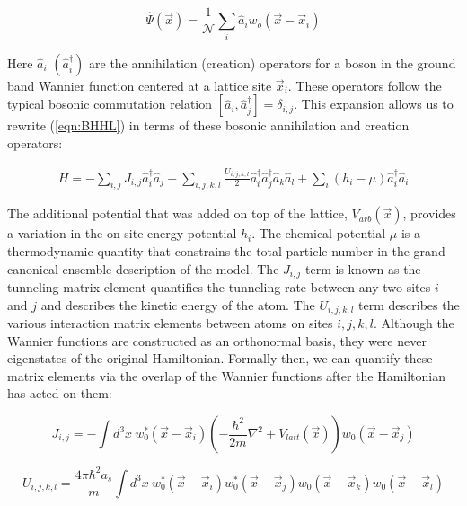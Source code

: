 \begin{equation}
\label{eqn:wfh}
\hat{\Psi}(\vec{x}) = \frac{1}{\mathcal{N}} \sum_i \hat{a}_i w_o(\vec{x}-\vec{x}_i)
\end{equation}

Here $\hat{a}_i$ $(\hat{a}^\dagger_i)$ are the annihilation (creation) operators for a boson in the ground band Wannier function centered at a lattice site $\vec{x}_i$. These operators follow the typical bosonic commutation relation $ [\hat{a}_i, \hat{a}_j^\dagger]=\delta_{i,j}$. This expansion allows us to rewrite (\ref{eqn:BHHL}) in terms of these bosonic annihilation and creation operators:

\begin{equation}
\begin{aligned}
H = - \sum_{i,j} J_{i,j} \hat{a}_i^\dagger \hat{a}_j + \sum_{i,j,k,l} \frac{U_{i,j,k,l}}{2} \hat{a}_i^\dagger \hat{a}_j^\dagger \hat{a}_k \hat{a}_l + \sum_i (h_i - \mu) \hat{a}^\dagger_i \hat{a}_i
\end{aligned}
\label{eqn:BHM}
\end{equation}

The additional potential that was added on top of the lattice, $V_{arb}(\vec{x})$, provides a variation in the on-site energy potential $h_i$. The chemical potential $\mu$ is a thermodynamic quantity that constrains the total particle number in the grand canonical ensemble description of the model. The $J_{i,j}$ term is known as the tunneling matrix element quantifies the tunneling rate between any two sites $i$ and $j$ and describes the kinetic energy of the atom. The $U_{i,j,k,l}$ term describes the various interaction matrix elements between atoms on sites $i,j,k,l$. Although the Wannier functions are constructed as an orthonormal basis, they were never eigenstates of the original Hamiltonian. Formally then, we can quantify these matrix elements via the overlap of the Wannier functions after the Hamiltonian has acted on them: 

\begin{equation}
J_{i,j} = - \int d^3 x ~ w^*_0 (\vec{x}-\vec{x}_i) \left ( - \frac{\hbar^2}{2m} \nabla^2 + V_{latt}(\vec{x}) \right ) w_0(\vec{x}-\vec{x}_j) 
\label{eqn:J}
\end{equation}

\begin{equation}
U_{i,j,k,l} = \frac{4 \pi \hbar^2 a_s}{m} \int d^3 x ~ w^*_0 (\vec{x}-\vec{x}_i) w^*_0 (\vec{x}-\vec{x}_j) w_0(\vec{x}-\vec{x}_k) w_0(\vec{x}-\vec{x}_l)
\label{eqn:U}
\end{equation}

